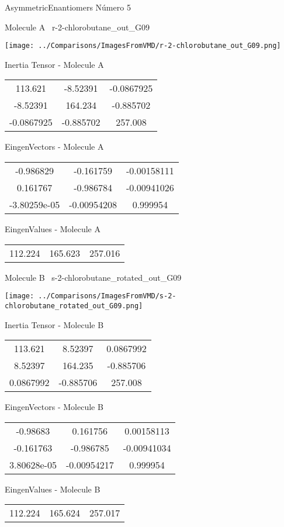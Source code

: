 \vtab[-3cm]
\begin{center}
{\large AsymmetricEnantiomers \tab Número 5}
\end{center}
\begin{multicols}{2}
\begin{center}

Molecule A \
r-2-chlorobutane\_out\_G09

\texttt{[image: ../Comparisons/ImagesFromVMD/r-2-chlorobutane\_out\_G09.png]}

Inertia Tensor - Molecule A \\
\begin{tabular}{|c c c|}
113.621	 & 	-8.52391	 & 	-0.0867925	 \\
-8.52391	 & 	164.234	 & 	-0.885702	 \\
-0.0867925	 & 	-0.885702	 & 	257.008
\end{tabular}

\vtab
 EingenVectors - Molecule A     \\
\begin{tabular}{|c c c|}
-0.986829	 & 	-0.161759	 & 	-0.00158111	 \\
0.161767	 & 	-0.986784	 & 	-0.00941026	 \\
-3.80259e-05	 & 	-0.00954208	 & 	0.999954
\end{tabular}

\vtab
 EingenValues - Molecule A     \\
\begin{tabular}{|c c c|}
112.224	 & 	165.623	 & 	257.016	 \\
\end{tabular}
\columnbreak

Molecule B \
s-2-chlorobutane\_rotated\_out\_G09

\texttt{[image: ../Comparisons/ImagesFromVMD/s-2-chlorobutane\_rotated\_out\_G09.png]}

Inertia Tensor - Molecule B \\
\begin{tabular}{|c c c|}
113.621	 & 	8.52397	 & 	0.0867992	 \\
8.52397	 & 	164.235	 & 	-0.885706	 \\
0.0867992	 & 	-0.885706	 & 	257.008
\end{tabular}

\vtab
 EingenVectors - Molecule B     \\
\begin{tabular}{|c c c|}
-0.98683	 & 	0.161756	 & 	0.00158113	 \\
-0.161763	 & 	-0.986785	 & 	-0.00941034	 \\
3.80628e-05	 & 	-0.00954217	 & 	0.999954
\end{tabular}

\vtab
 EingenValues - Molecule B     \\
\begin{tabular}{|c c c|}
112.224	 & 	165.624	 & 	257.017	 \\
\end{tabular}

\end{center}
\end{multicols}

